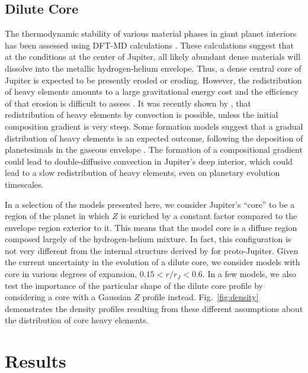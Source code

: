 \subsection{Dilute Core} \label{sec:dilute}

The thermodynamic stability of various material phases in giant planet
interiors has been assessed using DFT-MD calculations
\citep{wilson2012a,Wilson2012b,Wahl2013,Gonzalez2013}.  These calculations
suggest that at the conditions at the center of Jupiter, all likely abundant
dense materials will dissolve into the metallic hydrogen-helium envelope. Thus,
a dense central core of Jupiter is expected to be presently eroded or eroding.
However, the redistribution of heavy elements amounts to a large gravitational
energy cost and the efficiency of that erosion is difficult to assess
\citep[see][]{Guillot2004}.  It was recently shown by \citet{vazan2016},  that
redistribution of heavy elements by convection is possible, unless the initial
composition gradient is very steep.  Some formation models suggest that a
gradual distribution of heavy elements is an expected outcome, following the
deposition of planetesimals in the gaseous envelope \citep{lozovsky2017}. The
formation of a compositional gradient could lead to double-diffusive convection
\citep{Chabrier2007,Leconte2013} in Jupiter's deep interior, which could lead
to a slow redistribution of heavy elements, even on planetary evolution
timescales.

In a selection of the models presented here, we consider Jupiter's ``core'' to
be a region of the planet in which $Z$ is enriched by a constant factor
compared to the envelope region exterior to it. This means that the model core
is a diffuse region composed largely of the hydrogen-helium mixture. In fact,
this configuration is not very different from the internal structure derived by
\citet{lozovsky2017} for proto-Jupiter.  Given the current uncertainty in the
evolution of a dilute core, we consider models with core in various degrees of
expansion, $0.15<r/r_J<0.6$.  In a few models, we also test the importance of
the particular shape of the dilute core profile by considering a core with a
Gaussian $Z$ profile instead.  Fig.~\ref{fig:density} demonstrates the density
profiles resulting from these different assumptions about the distribution of
core heavy elements. 

\section{Results} \label{sec:results}

